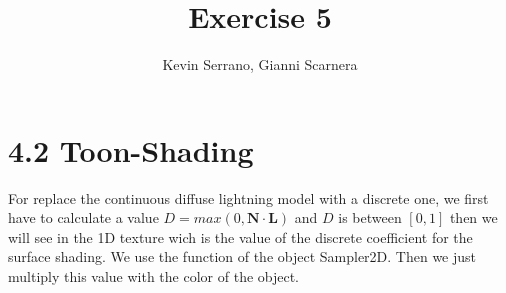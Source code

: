 \documentclass[10pt,a4paper]{report}
\author{Kevin Serrano, Gianni Scarnera}
\title{Exercise 5}
\begin{document}
\maketitle

\section*{4.2   Toon-Shading }
For replace the continuous diffuse lightning model with a discrete one, we first have to calculate a value $D = max(0,\mathbf{N \cdot L})$ and $D$ is between $[0,1]$ then we will see in the 1D texture wich is the value of the discrete coefficient for the surface shading. We use the function of the object Sampler2D. Then we just multiply this value with the color of the object.
\end{document}
